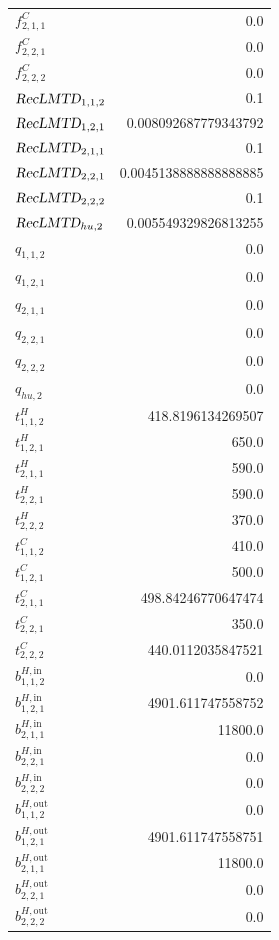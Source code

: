 \documentclass{article}%
\begin{document}
\begin{multicols*}{3}
\begin{supertabular}{lr}
	$f_{2,1,1}^{C}$ & 0.0 \\%
	$f_{2,2,1}^{C}$ & 0.0 \\%
	$f_{2,2,2}^{C}$ & 0.0 \\%
	$\textsl{RecLMTD}_{1,1,2}$ & 0.1 \\%
	$\textsl{RecLMTD}_{1,2,1}$ & 0.008092687779343792 \\%
	$\textsl{RecLMTD}_{2,1,1}$ & 0.1 \\%
	$\textsl{RecLMTD}_{2,2,1}$ & 0.0045138888888888885 \\%
	$\textsl{RecLMTD}_{2,2,2}$ & 0.1 \\%
	$\textsl{RecLMTD}_{hu,2}$ & 0.005549329826813255 \\%
	$q_{1,1,2}$ & 0.0 \\%
	$q_{1,2,1}$ & 0.0 \\%
	$q_{2,1,1}$ & 0.0 \\%
	$q_{2,2,1}$ & 0.0 \\%
	$q_{2,2,2}$ & 0.0 \\%
	$q_{hu,2}$ & 0.0 \\%
	$t_{1,1,2}^{H}$ & 418.8196134269507 \\%
	$t_{1,2,1}^{H}$ & 650.0 \\%
	$t_{2,1,1}^{H}$ & 590.0 \\%
	$t_{2,2,1}^{H}$ & 590.0 \\%
	$t_{2,2,2}^{H}$ & 370.0 \\%
	$t_{1,1,2}^{C}$ & 410.0 \\%
	$t_{1,2,1}^{C}$ & 500.0 \\%
	$t_{2,1,1}^{C}$ & 498.84246770647474 \\%
	$t_{2,2,1}^{C}$ & 350.0 \\%
	$t_{2,2,2}^{C}$ & 440.0112035847521 \\%
	$b_{1,1,2}^{H,\text{in}}$ & 0.0 \\%
	$b_{1,2,1}^{H,\text{in}}$ & 4901.611747558752 \\%
	$b_{2,1,1}^{H,\text{in}}$ & 11800.0 \\%
	$b_{2,2,1}^{H,\text{in}}$ & 0.0 \\%
	$b_{2,2,2}^{H,\text{in}}$ & 0.0 \\%
	$b_{1,1,2}^{H,\text{out}}$ & 0.0 \\%
	$b_{1,2,1}^{H,\text{out}}$ & 4901.611747558751 \\%
	$b_{2,1,1}^{H,\text{out}}$ & 11800.0 \\%
	$b_{2,2,1}^{H,\text{out}}$ & 0.0 \\%
	$b_{2,2,2}^{H,\text{out}}$ & 0.0 \\%

\end{supertabular}
\end{multicols*}
\end{document}
